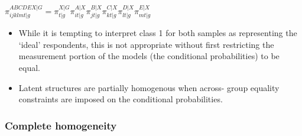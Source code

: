 \documentclass[12pt,twoside]{reedthesis}
\providecommand{\tightlist}{%
  \setlength{\itemsep}{0pt}\setlength{\parskip}{0pt}}
\begin{document}
\(\pi_{ijklmt|g}^{ABCDEX|G} = \pi_{t|g}^{X|G} \pi_{it|g}^{A|X} \pi_{jt|g}^{B|X} \pi_{kt|g}^{C|X} \pi_{lt|g}^{D|X} \pi_{mt|g}^{E|X}\)
\begin{itemize}
\tightlist
\item
  While it is tempting to interpret class 1 for both samples as representing the `ideal' respondents, this is not appropriate without first restricting the measurement portion of the models (the conditional probabilities) to be equal.
\item
  Latent structures are partially homogenous when across- group equality constraints are imposed on the conditional probabilities.
\end{itemize}
\hypertarget{complete-homogeneity}{%
\subsubsection{Complete homogeneity}\label{complete-homogeneity}}
\end{document}
